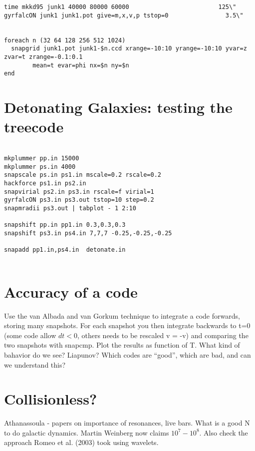 \footnotesize\begin{verbatim}
time mkkd95 junk1 40000 80000 60000                         125\"
gyrfalcON junk1 junk1.pot give=m,x,v,p tstop=0                3.5\"


foreach n (32 64 128 256 512 1024)
  snapgrid junk1.pot junk1-$n.ccd xrange=-10:10 yrange=-10:10 yvar=z zvar=t zrange=-0.1:0.1 
        mean=t evar=phi nx=$n ny=$n
end

\end{verbatim}\normalsize  %

\section{Detonating Galaxies: testing the treecode}

\footnotesize\begin{verbatim}

mkplummer pp.in 15000
mkplummer ps.in 4000
snapscale ps.in ps1.in mscale=0.2 rscale=0.2
hackforce ps1.in ps2.in
snapvirial ps2.in ps3.in rscale=f virial=1
gyrfalcON ps3.in ps3.out tstop=10 step=0.2
snapmradii ps3.out | tabplot - 1 2:10

snapshift pp.in pp1.in 0.3,0.3,0.3
snapshift ps3.in ps4.in 7,7,7 -0.25,-0.25,-0.25

snapadd pp1.in,ps4.in  detonate.in


\end{verbatim}\normalsize  

\section{Accuracy of a code}

Use the van Albada and van Gorkum technique to integrate a code
forwards, storing many snapshots. For each snapshot you then integrate
backwards to t=0 (some code allow $dt<0$, others needs to be
rescaled v = -v) and comparing the two snapshots with snapcmp.
Plot the results as function of T. What kind of bahavior do we see?
Liapunov?  Which codes are ``good'', which are bad, and can we 
understand this?


\section{Collisionless?}

Athanassoula - papers on importance of resonances, live bars. What is a good N to do
galactic dynamics. Martin Weinberg now claims $10^7-10^8$. 
Also check the approach Romeo et al. (2003) took using wavelets.

